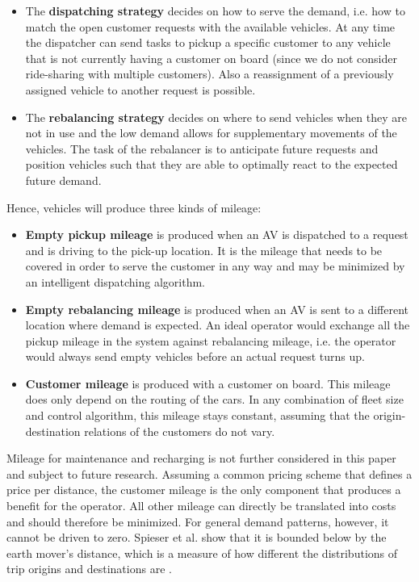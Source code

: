 \begin{itemize}
\item The \textbf{dispatching strategy} decides on how to serve the demand, i.e.
how to match the open customer requests with the available vehicles. At any time the dispatcher can send tasks to pickup a specific customer to any vehicle that is not currently having a customer on board (since we do not consider ride-sharing with multiple customers). Also a reassignment of a previously assigned
vehicle to another request is possible.
\item The \textbf{rebalancing strategy} decides on where to send vehicles when they
are not in use and the low demand allows for supplementary movements of the vehicles.
The task of the rebalancer is to anticipate future requests and position vehicles
such that they are able to optimally react to the expected future demand.
\end{itemize}

Hence, vehicles will produce three kinds of mileage:

\begin{itemize}
\item \textbf{Empty pickup mileage} is produced when an AV is dispatched
to a request and is driving to the pick-up location. It is the mileage that needs
to be covered in order to serve the customer in any way and may be minimized
by an intelligent dispatching algorithm.
\item \textbf{Empty rebalancing mileage} is produced when an AV is sent
to a different location where demand is expected. An ideal operator would
exchange all the pickup mileage in the system against rebalancing mileage, i.e. the operator would always send empty vehicles before an actual request turns up.
\item \textbf{Customer mileage} is produced with a customer on board. This mileage does only depend on the routing of the cars. In any combination of fleet size and
control algorithm, this mileage stays constant, assuming that the origin-destination relations of the customers do not vary.
\end{itemize}

Mileage for maintenance and recharging is not further considered in this paper and subject to future research. 
Assuming a common pricing scheme that defines a price per distance, the customer mileage
is the only component that produces a benefit for the operator. All other mileage
can directly be translated into costs and should therefore be minimized. For general
demand patterns, however, it cannot be driven to zero. Spieser et al. \cite{spieser2014toward}
show that it is bounded below by the earth mover's distance, which is a measure
of how different the distributions of trip origins and destinations are \cite{ruschendorf1985wasserstein}.

